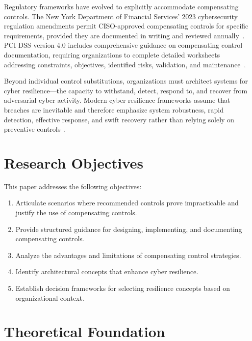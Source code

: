 \documentclass[sigconf,nonacm]{acmart}
\begin{document}
Regulatory frameworks have evolved to explicitly accommodate compensating controls.
The New York Department of Financial Services' 2023 cybersecurity regulation amendments
permit CISO-approved compensating controls for specific requirements, provided they are
documented in writing and reviewed annually~\cite{koleyjessen2024}. PCI DSS version 4.0
includes comprehensive guidance on compensating control documentation, requiring
organizations to complete detailed worksheets addressing constraints, objectives,
identified risks, validation, and maintenance~\cite{techtarget2024}.

Beyond individual control substitutions, organizations must architect systems for cyber
resilience---the capacity to withstand, detect, respond to, and recover from adversarial
cyber activity. Modern cyber resilience frameworks assume that breaches are inevitable
and therefore emphasize system robustness, rapid detection, effective response, and swift
recovery rather than relying solely on preventive controls~\cite{zeronetworks2024,
guidehouse2023}.

\section{Research Objectives}

This paper addresses the following objectives:
\begin{enumerate}
  \item Articulate scenarios where recommended controls prove impracticable and justify
        the use of compensating controls.
  \item Provide structured guidance for designing, implementing, and documenting
        compensating controls.
  \item Analyze the advantages and limitations of compensating control strategies.
  \item Identify architectural concepts that enhance cyber resilience.
  \item Establish decision frameworks for selecting resilience concepts based on
        organizational context.
\end{enumerate}

\section{Theoretical Foundation}
\end{document}
